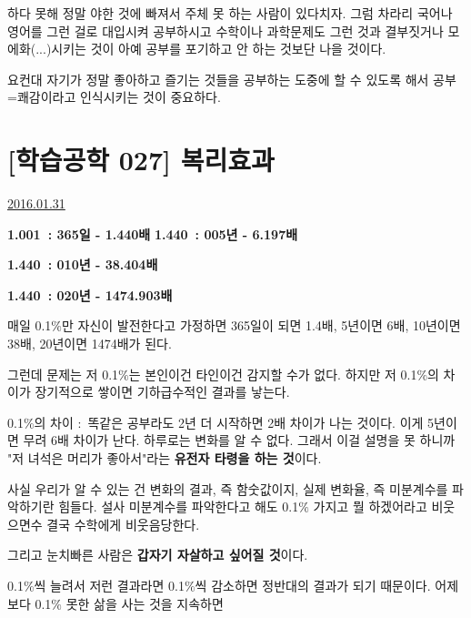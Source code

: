 하다 못해 정말 야한 것에 빠져서 주체 못 하는 사람이 있다치자.
그럼 차라리 국어나 영어를 그런 걸로 대입시켜 공부하시고
수학이나 과학문제도 그런 것과 결부짓거나 모에화(...)시키는 것이 아예 공부를 포기하고 안 하는 것보단 나을 것이다.
\vspace{5mm}

요컨대 자기가 정말 좋아하고 즐기는 것들을 공부하는 도중에 할 수 있도록 해서 공부=쾌감이라고 인식시키는 것이 중요하다.
\vspace{5mm}




\section{[학습공학 027] 복리효과}
\href{https://www.kockoc.com/Apoc/618752}{2016.01.31}

\vspace{5mm}

\textbf{1.001 : 365일 - 1.440배}
\textbf{1.440 : 005년 - 6.197배}
\vspace{5mm}

\textbf{1.440 : 010년 - 38.404배}
\vspace{5mm}

\textbf{1.440 : 020년 - 1474.903배}
\vspace{5mm}

매일 0.1$\%$만 자신이 발전한다고 가정하면 365일이 되면 1.4배, 5년이면 6배, 10년이면 38배, 20년이면 1474배가 된다.
\vspace{5mm}

그런데 문제는 저 0.1$\%$는 본인이건 타인이건 감지할 수가 없다.
하지만 저 0.1$\%$의 차이가 장기적으로 쌓이면 기하급수적인 결과를 낳는다.
\vspace{5mm}

0.1$\%$의 차이 : 똑같은 공부라도 2년 더 시작하면 2배 차이가 나는 것이다.
이게 5년이면 무려 6배 차이가 난다.
하루로는 변화를 알 수 없다. 그래서 이걸 설명을 못 하니까 "저 녀석은 머리가 좋아서"라는 \textbf{유전자 타령을 하는 것}이다.
\vspace{5mm}

사실 우리가 알 수 있는 건 변화의 결과, 즉 함숫값이지, 실제 변화율, 즉 미분계수를 파악하기란 힘들다.
설사 미분계수를 파악한다고 해도 0.1$\%$ 가지고 뭘 하겠어라고 비웃으면수 결국 수학에게 비웃음당한다.
\vspace{5mm}

그리고 눈치빠른 사람은 \textbf{갑자기 자살하고 싶어질 것}이다.
\vspace{5mm}

0.1$\%$씩 늘려서 저런 결과라면
0.1$\%$씩 감소하면 정반대의 결과가 되기 때문이다.
어제보다 0.1$\%$ 못한 삶을 사는 것을 지속하면
\vspace{5mm}

